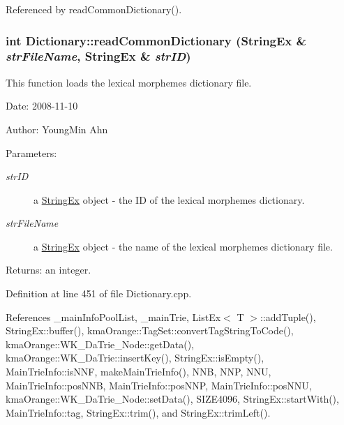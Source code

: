 Referenced by readCommonDictionary().\hypertarget{classkmaOrange_1_1Dictionary_e29df4e3436b7fa1f06c9afea1f3c633}{
\subsubsection[{readCommonDictionary}]{\setlength{\rightskip}{0pt plus 5cm}int Dictionary::readCommonDictionary ({\bf StringEx} \& {\em strFileName}, \/  {\bf StringEx} \& {\em strID})}}
\label{classkmaOrange_1_1Dictionary_e29df4e3436b7fa1f06c9afea1f3c633}


This function loads the lexical morphemes dictionary file. 

\begin{Desc}
\item[Date:]2008-11-10 \end{Desc}
\begin{Desc}
\item[Author:]YoungMin Ahn \end{Desc}
\begin{Desc}
\item[Parameters:]
\begin{description}
\item[{\em strID}]a \hyperlink{classStringEx}{StringEx} object - the ID of the lexical morphemes dictionary. \item[{\em strFileName}]a \hyperlink{classStringEx}{StringEx} object - the name of the lexical morphemes dictionary file. \end{description}
\end{Desc}
\begin{Desc}
\item[Returns:]an integer. \end{Desc}


Definition at line 451 of file Dictionary.cpp.

References \_\-mainInfoPoolList, \_\-mainTrie, ListEx$<$ T $>$::addTuple(), StringEx::buffer(), kmaOrange::TagSet::convertTagStringToCode(), kmaOrange::WK\_\-DaTrie\_\-Node::getData(), kmaOrange::WK\_\-DaTrie::insertKey(), StringEx::isEmpty(), MainTrieInfo::isNNF, makeMainTrieInfo(), NNB, NNP, NNU, MainTrieInfo::posNNB, MainTrieInfo::posNNP, MainTrieInfo::posNNU, kmaOrange::WK\_\-DaTrie\_\-Node::setData(), SIZE4096, StringEx::startWith(), MainTrieInfo::tag, StringEx::trim(), and StringEx::trimLeft().

